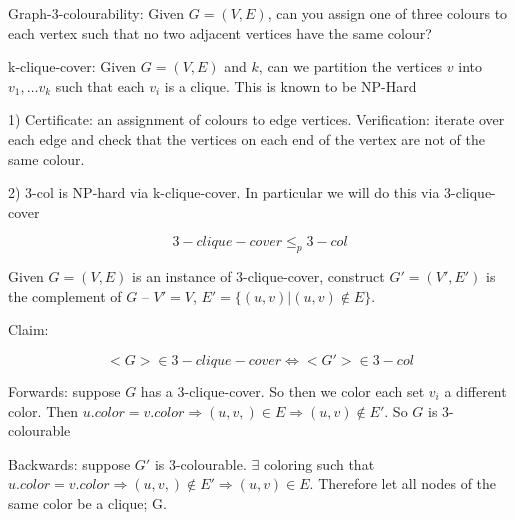 \documentclass[../notes.tex]{subfiles}
\begin{document}
\begin{example}
	Graph-3-colourability: Given $ G=  (V,E) $, can you assign one of three colours to each vertex such that no two adjacent vertices have the same colour?


	k-clique-cover: Given $ G = (V,E) $ and $ k $, can we partition the vertices $ v $ into $ v_1, \ldots v_k $ such that each $ v_i $ is a clique. This is known to be NP-Hard


	1) Certificate: an assignment of colours to edge vertices. Verification: iterate over each edge and check that the vertices on each end of the vertex are not of the same colour.

	2) 3-col is NP-hard via k-clique-cover. In particular we will do this via 3-clique-cover

	\begin{equation}
		3-clique-cover \le_p 3-col
	\end{equation}

	Given $ G = (V,E) $ is an instance of 3-clique-cover, construct $ G' = (V', E') $ is the complement of $ G$ -- $ V' = V $, $ E' = \{(u,v)| (u,v) \notin E\} $. 

	Claim: 

	\begin{equation}
		<G> \in 3-clique-cover \Leftrightarrow <G'> \in 3-col
	\end{equation}

	Forwards: suppose $ G $ has a 3-clique-cover. So then we color each set $ v_i $ a different color. Then $ u.color = v.color \Rightarrow (u,v,) \in E \Rightarrow (u,v) \notin E' $.
	So $ G $ is 3-colourable

	Backwards: suppose $ G' $ is 3-colourable. $ \exists $ coloring such that $ u.color = v.color \Rightarrow (u,v,) \notin E' \Rightarrow (u,v) \in E $. Therefore let all nodes of the same color be a clique; G.



\end{example}
\end{document}
